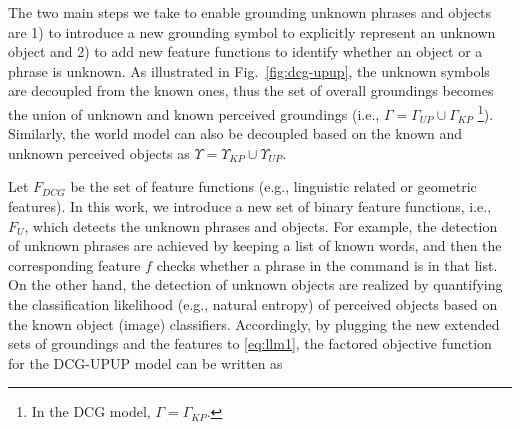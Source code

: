 The two main steps we take to enable grounding unknown phrases and objects are 1) to introduce a new grounding symbol to explicitly represent an unknown object and 2) to add new feature functions to identify whether an object or a phrase is unknown. As illustrated in Fig.~\ref{fig:dcg-upup}, the unknown symbols are decoupled from the known ones, thus the set of overall groundings becomes the union of unknown and known perceived groundings (i.e., $\Gamma = \Gamma_{UP} \cup \Gamma_{KP}$ \footnote{In the DCG model, $\Gamma = \Gamma_{KP}$.}). Similarly, the world model can also be decoupled based on the known and unknown perceived objects as $\Upsilon = \Upsilon_{KP} \cup \Upsilon_{UP}$.

Let $F_{DCG}$ be the set of feature functions (e.g., linguistic related or geometric features). In this work, we introduce a new set of binary feature functions, i.e., $F_U$, which detects the unknown phrases and objects. For example, the detection of unknown phrases are achieved by keeping a list of known words, and then the corresponding feature $f$ checks whether a phrase in the command is in that list. On the other hand, the detection of unknown objects are realized by quantifying the classification likelihood (e.g., natural entropy) of perceived objects based on the known object (image) classifiers. Accordingly, by plugging the new extended sets of groundings and the features to \eqref{eq:llm1}, the factored objective function for the DCG-UPUP model can be written as      


